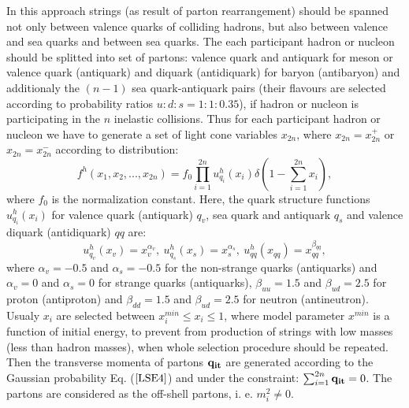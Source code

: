 \hspace{1.0em}In this approach \cite{Am86} strings (as result of parton
rearrangement) should be spanned not only between valence quarks of
colliding hadrons, but also between valence and sea quarks and between
sea quarks.  The each participant hadron or nucleon should be splitted
into set of partons: valence quark and antiquark for meson or valence
quark (antiquark) and diquark (antidiquark) for baryon (antibaryon) and
additionaly the $(n-1)$ sea quark-antiquark pairs (their flavours are
selected according to probability ratios $ u:d:s = 1:1:0.35$), if hadron
or nucleon is participating in the $n$ inelastic collisions.  Thus for
each participant hadron or nucleon we have to generate a set of light
cone variables $x_{2n}$, where $x_{2n}=x^{+}_{2n}$ or
$x_{2n}=x^{-}_{2n}$ according to distribution:
\begin{equation}
\label{LS10} f^{h}(x_1,x_2,...,x_{2n})=f_{0}\prod_{i=1}^{2n}u^h_{q_i}(x_i)
\delta{(1-\sum_{i=1}^{2n}x_i)},
\end{equation}
where $f_0$ is the normalization constant.
Here, the quark structure functions $u_{q_i}^h(x_i)$ for valence quark 
(antiquark) $q_v$, 
sea quark and antiquark $q_s$ and valence diquark (antidiquark) $qq$ are:
\begin{equation}
\label{LS11}
u^h_{q_v}(x_v)=x_v^{\alpha_v},\ u^h_{q_s}(x_s)=x_s^{\alpha_s},\ u^h_{qq}(x_{qq})
=x_{qq}^{\beta_{qq}},
\end{equation}
where $\alpha_v = -0.5$ and $\alpha_s = -0.5$ \cite{QGSM82} 
 for the non-strange quarks (antiquarks) and $\alpha_v =
0$ and $\alpha_s = 0$ for strange quarks (antiquarks), $\beta_{uu} =
1.5$ and $\beta_{ud} = 2.5$ for proton (antiproton) and $\beta_{dd} =
1.5$ and $\beta_{ud} = 2.5$ for neutron (antineutron).  Usualy $x_i$ are
selected between $x^{min}_i \leq x_i \leq 1$, where model parameter
$x^{min}$ is a function of initial energy, to prevent from production of
strings with low masses (less than hadron masses), when whole selection
procedure should be repeated.  Then the transverse momenta of partons
${\bf q_{it}}$ are generated according to the Gaussian probability
Eq. ($\ref{LSE4}$) and under the constraint: $\sum_{i=1}^{2n}{\bf
q_{it}}=0$. The partons are considered as the off-shell partons,
i. e. $m^2_i \neq 0$.

